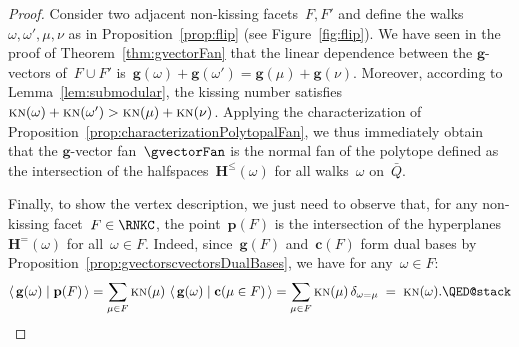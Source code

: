 \documentclass{memo-l}
\theoremstyle{definition}
\renewcommand{\b}[1]{\mathbf{#1}} %
\newcommand{\dotprod}[2]{\left\langle \, #1 \; \middle| \; #2 \, \right\rangle} %
\newcommand{\fref}[1]{Figure~\ref{#1}} %
\newcommand{\KN}{\textsc{kn}} %
\newcommand{\gvector}[1]{\mathbf{g}(#1)} %
\newcommand{\gvectors}[1]{\mathbf{g}(#1)} %
\newcommand{\cvector}[2]{\mathbf{c}(#1 \in #2)} %
\newcommand{\cvectors}[1]{\mathbf{c}(#1)} %
\newcommand{\point}[1]{\mathbf{p}(#1)} %
\newcommand{\HS}[1]{\mathbf{H}^{\le}(#1)} %
\newcommand{\Hyp}[1]{\mathbf{H}^{=}(#1)} %
\begin{document}
\begin{proof}
Consider two adjacent non-kissing facets~$F,F'$ and define the walks ${\omega, \omega', \mu, \nu}$ as in Proposition~\ref{prop:flip} (see \fref{fig:flip}).
We have seen in the proof of Theorem~\ref{thm:gvectorFan} that the linear dependence between the $\b{g}$-vectors of~$F \cup F'$ is~$\gvector{\omega} + \gvector{\omega'} = \gvector{\mu} + \gvector{\nu}$.
Moreover, according to Lemma~\ref{lem:submodular}, the kissing number satisfies~$\KN(\omega) + \KN(\omega') > \KN(\mu) + \KN(\nu)$.
Applying the characterization of Proposition~\ref{prop:characterizationPolytopalFan}, we thus immediately obtain that the $\b{g}$-vector fan~$\gvectorFan$ is the normal fan of the polytope defined as the intersection of the halfspaces~$\HS{\omega}$ for all walks~$\omega$ on~$\bar Q$.

Finally, to show the vertex description, we just need to observe that, for any non-kissing facet~$F \in \RNKC$, the point~$\point{F}$ is the intersection of the hyperplanes~$\Hyp{\omega}$ for all~$\omega \in F$.
Indeed, since~$\gvectors{F}$ and~$\cvectors{F}$ form dual bases by Proposition~\ref{prop:gvectorscvectorsDualBases}, we have for any~$\omega \in F$:
\[
\dotprod{\gvector{\omega}}{\point{F}} = \sum_{\mu \in F} \KN(\mu) \, \dotprod{\gvector{\omega}}{\cvector{\mu}{F}} = \sum_{\mu \in F} \KN(\mu) \, \delta_{\omega = \mu} \; = \; \KN(\omega).
\qedhere
\]
\end{proof}
\end{document}
